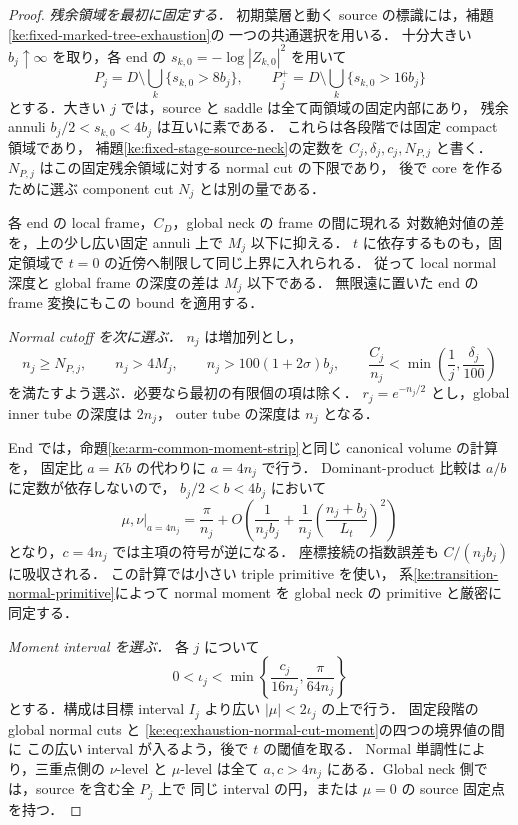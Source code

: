 \begin{proof}
\emph{残余領域を最初に固定する．}
初期葉層と動く source の標識には，補題\ref{ke:fixed-marked-tree-exhaustion}の
一つの共通選択を用いる．
十分大きい $b_j\uparrow\infty$ を取り，各 end の
$s_{k,0}=-\log|Z_{k,0}|^2$ を用いて
\[
 P_j=D\setminus\bigcup_k\{s_{k,0}>8b_j\},\qquad
 P_j^+=D\setminus\bigcup_k\{s_{k,0}>16b_j\}
\]
とする．大きい $j$ では，source と saddle は全て両領域の固定内部にあり，
残余 annuli $b_j/2<s_{k,0}<4b_j$ は互いに素である．
これらは各段階では固定 compact 領域であり，
補題\ref{ke:fixed-stage-source-neck}の定数を
$C_j,\delta_j,c_j,N_{P,j}$ と書く．
$N_{P,j}$ はこの固定残余領域に対する normal cut の下限であり，
後で core を作るために選ぶ component cut $N_j$ とは別の量である．

各 end の local frame，$C_D$，global neck の frame の間に現れる
対数絶対値の差を，上の少し広い固定 annuli 上で $M_j$ 以下に抑える．
$t$ に依存するものも，固定領域で $t=0$ の近傍へ制限して同じ上界に入れられる．
従って local normal 深度と global frame の深度の差は $M_j$ 以下である．
無限遠に置いた end の frame 変換にもこの bound を適用する．

\emph{Normal cutoff を次に選ぶ．}
$n_j$ は増加列とし，
\[
 n_j\ge N_{P,j},\qquad n_j>4M_j,\qquad
 n_j>100(1+2\sigma)b_j,\qquad
 \frac{C_j}{n_j}<\min\left(\frac1j,\frac{\delta_j}{100}\right)
\]
を満たすよう選ぶ．必要なら最初の有限個の項は除く．
$r_j=e^{-n_j/2}$ とし，global inner tube の深度は $2n_j$，
outer tube の深度は $n_j$ となる．

End では，命題\ref{ke:arm-common-moment-strip}と同じ canonical volume の計算を，
固定比 $a=Kb$ の代わりに $a=4n_j$ で行う．
Dominant-product 比較は $a/b$ に定数が依存しないので，
$b_j/2<b<4b_j$ において
\begin{equation}\label{ke:eq:exhaustion-normal-cut-moment}
 \mu,\nu\big|_{a=4n_j}
 =\frac{\pi}{n_j}
  +O\left(\frac1{n_jb_j}
         +\frac1{n_j}\left(\frac{n_j+b_j}{L_t}\right)^2\right)
\end{equation}
となり，$c=4n_j$ では主項の符号が逆になる．
座標接続の指数誤差も $C/(n_jb_j)$ に吸収される．
この計算では小さい triple primitive を使い，
系\ref{ke:transition-normal-primitive}によって normal moment を global neck の
primitive と厳密に同定する．

\emph{Moment interval を選ぶ．}
各 $j$ について
\[
 0<\iota_j<\min\left\{\frac{c_j}{16n_j},\frac{\pi}{64n_j}\right\}
\]
とする．構成は目標 interval $I_j$ より広い $|\mu|<2\iota_j$ の上で行う．
固定段階の global normal cuts と
\eqref{ke:eq:exhaustion-normal-cut-moment}の四つの境界値の間に
この広い interval が入るよう，後で $t$ の閾値を取る．
Normal 単調性により，三重点側の $\nu$-level と $\mu$-level は全て
$a,c>4n_j$ にある．Global neck 側では，source を含む全 $P_j$ 上で
同じ interval の円，または $\mu=0$ の source 固定点を持つ．


\end{proof}
